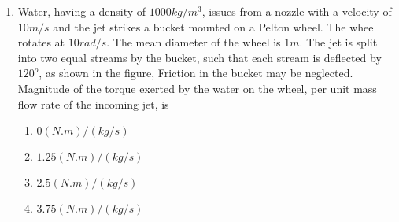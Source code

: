 \documentclass[journal]{IEEEtran}
\begin{document}
\begin{enumerate}[start=35]
\begin{figure}[!ht]
\label{fig:my_label}
\end{figure}
    
    \begin{multicols}{4}
        \begin{enumerate}
            \item $10^o C$
            \item $20^o C$
            \item $30^o C$
            \item $40^o C$
        \end{enumerate}
    \end{multicols}

    \item Water, having a density of $1000 kg/m^3$, issues from a nozzle with a velocity of $10 m/s$ and the jet strikes a bucket mounted on a Pelton wheel. The wheel rotates at $10 rad/s$. The mean diameter of the wheel is $1 m$. The jet is split into two equal streams by the bucket, such that each stream is deflected by $120^o$, as shown in the figure, Friction in the bucket may be neglected. Magnitude of the torque exerted by the water on the wheel, per unit mass flow rate of the incoming jet, is

    \begin{figure}[!ht]
\centering
{}%

\label{fig:my_label}
\end{figure}
    
    \begin{multicols}{2}
        \begin{enumerate}
            \item $0 (N.m)/(kg/s)$
            \item $1.25(N.m)/(kg/s)$
            \item $2.5(N.m)/(kg/s)$
            \item $3.75(N.m)/(kg/s)$
        \end{enumerate}
    \end{multicols}



    


\end{enumerate}
\end{document}
